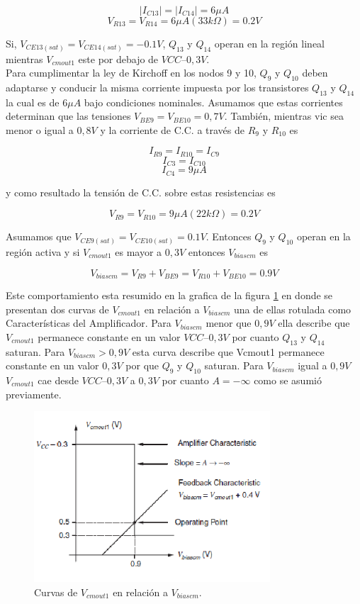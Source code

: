 \documentclass[12pt,a4paper,final,headinclude,footinclude,BCOR5mm]{scrartcl}
\begin{document}
$$|I_{C13}|=|I_{C14}|=6 \mu A$$
$$V_{R13} = V_{R14} = 6 \mu A (33 k \Omega) = 0.2 V$$

Si, $V_{CE13(sat)} = V_{CE14(sat)} = -0.1 V$, $Q_{13}$ y $Q_{14}$ operan en la región lineal mientras $V_{cmout1}$ este por debajo de $VCC – 0,3 V$.\\

Para cumplimentar la ley de Kirchoff en los nodos 9 y 10, $Q_{9}$ y $Q_{10}$ deben adaptarse y conducir la misma corriente impuesta por los transistores $Q_{13}$ y $Q_{14}$ la cual es de $6 \mu A$ bajo condiciones nominales. Asumamos que estas corrientes determinan que las tensiones $V_{BE9} = V_{BE10} = 0,7 V$. También, mientras vic sea menor o igual a $0,8 V$ y la corriente de C.C. a través de $R_{9}$ y $R_{10}$  es

$$I_{R9} = I_{R10} = I_{C9}$$
$$I_{C3} = I_{C10}$$
$$I_{C4} = 9 \mu A$$

y como resultado la tensión de C.C. sobre estas resistencias es

$$V_{R9} = V_{R10} = 9 \mu A (22 k \Omega) = 0.2 V$$

Asumamos que $V_{CE9(sat)} = V_{CE10(sat)} = 0.1 V$. Entonces $Q_{9}$ y $Q_{10}$ operan en la región activa y si $V_{cmout1}$ es mayor a $0,3 V$ entonces $V_{biascm}$ es

$$V_{biascm} = V_{R9} + V_{BE9} = V_{R10} + V_{BE10} = 0.9 V$$

Este comportamiento esta resumido en la grafica de la figura \ref{638} en donde se presentan dos curvas de $V_{cmout1}$ en relación a $V_{biascm}$ una de ellas rotulada como Características del Amplificador. Para $V_{biascm}$ menor que $0,9 V$ ella describe que $V_{cmout1}$ permanece constante en un valor $VCC – 0,3 V$ por cuanto $Q_{13}$ y $Q_{14}$ saturan.  Para $V_{biascm} > 0,9 V$  esta curva describe que  Vcmout1  permanece constante en un valor $0,3 V$ por que $Q_{9}$ y $Q_{10}$ saturan. Para $V_{biascm}$ igual a $0,9 V$ $V_{cmout1}$ cae desde  $VCC – 0,3 V$ a  $0,3 V$  por cuanto $A = - \infty$ como se asumió previamente.\\

\begin{figure}[!h]
\begin{center}
\includegraphics[width=250pt]{./imagenes/curvasvcmout1.png}
\end{center}
\caption{Curvas de $V_{cmout1}$ en relación a $V_{biascm}$.}
\label{638}
\end{figure}
\end{document}
